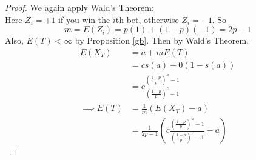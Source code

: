 \documentclass[11pt]{article}
\begin{document}
    \begin{proof}
    	We again apply Wald's Theorem:\\
    	Here $Z_i = +1$ if you win the $i$th bet, otherwise $Z_i = -1$. So $$m = E(Z_i) = p(1) + (1-p)(-1) = 2p-1$$ Also, $E(T) < \infty$ by Proposition \ref{gb}. Then by Wald's Theorem,
    	\begin{align*}
    		E(X_T) &= a + mE(T) \\
    		&= cs(a) + 0(1-s(a)) \\
    		&= c \frac{\left( \frac{1-p}{p}\right)^a - 1}{\left( \frac{1-p}{p}\right)^c - 1}\\
    		\implies E(T) &= \frac{1}{m}(E(X_T) - a) \\
    		&= \frac{1}{2p-1}\left( c \frac{\left( \frac{1-p}{p}\right)^a - 1}{\left( \frac{1-p}{p}\right)^c - 1}-a\right)
    	\end{align*}
    \end{proof}
    
\end{document}
